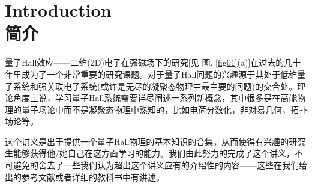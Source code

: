 \documentclass[10pt]{book}
\begin{document}
%
%
{}
\tableofcontents


\chapter[简介]{Introduction\\\bf 简介}
\setcounter{page}{1}


量子Hall效应——二维(2D)电子在强磁场下的研究[见 图. \ref{fig01}(a)]在过去的几十年里成为了一个非常重要的研究课题。对于量子Hall问题的兴趣源于其处于低维量子系统和强关联电子系统(或许是无尽的凝聚态物理中最主要的问题)的交合处。理论角度上说，学习量子Hall系统需要详尽阐述一系列新概念，其中很多是在高能物理的量子场论中而不是凝聚态物理中熟知的，比如电荷分数化，非对易几何，拓扑场论等。

这个讲义是出于提供一个量子Hall物理的基本知识的合集，从而使得有兴趣的研究生能够获得他/她自己在这方面学习的能力。我们由此努力的完成了这个讲义，不可避免的舍去了一些我们认为超出这个讲义应有的介绍性的内容——这些在我们给出的参考文献或者详细的教科书中有讲述。
\end{document}
